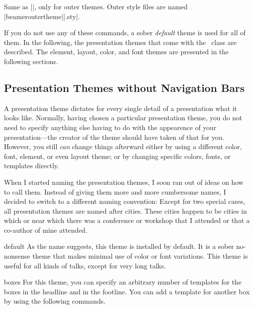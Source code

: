 \begin{command}{\useoutertheme{}}
  Same as |\usetheme|, only for outer themes. Outer style files
  are named |beameroutertheme||.sty|.
\end{command}

If you do not use any of these commands, a sober \emph{default} theme
is used for all of them. In the following, the presentation themes
that come with the \beamer\ class are described. The element, layout,
color, and font themes  are presented in the following sections.



\subsection{Presentation Themes without Navigation Bars}

A presentation theme dictates for every single detail
of a presentation what it looks like. Normally, having chosen a
particular presentation theme, you do not need to specify anything
else having to do with the appearence of your presentation---the
creator of the theme should have taken of that for you. However, you
still \emph{can} change things afterward either by using a different
color, font, element, or even layout theme; or by changing specific
colors, fonts, or templates directly.

When I started naming the presentation themes, I soon ran out of ideas
on how to call them. Instead of giving them more and more cumbersome
names, I decided to switch to a different naming convention:
Except for two special cases, all presentation themes are named after
cities. These cities happen to be cities in which or near which there
was a conference or workshop that I attended or that a
co-author of mine attended. 


\begin{themeexample}{default}
  As the name suggests, this theme is installed by default. It is a
  sober no-nonsense theme that makes minimal use of color or font
  variations. This theme is useful for all kinds of talks, except for
  very long talks.
\end{themeexample}


\begin{themeexample}[{\opt{|[headheight=|\meta{head height}|,footheight=|\meta{foot height}|]|}}]{boxes}
  For this theme, you can specify an arbitrary number of templates for
  the boxes in the headline and in the footline. You can add a
  template for another box by using the following commands.
\end{themeexample}

